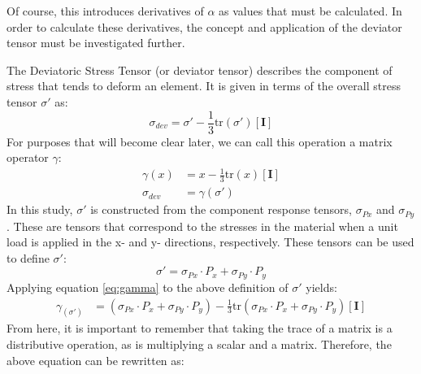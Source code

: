 Of course, this introduces derivatives of $\alpha$ as values that must be calculated. In order to calculate these derivatives, the concept and application of the deviator tensor must be investigated further.


The Deviatoric Stress Tensor (or deviator tensor) describes the component of stress that tends to deform an element. It is given in terms of the overall stress tensor $\sigma'$ as: 
   \begin{equation}
      \sigma_{dev} = \sigma' - \frac{1}{3} \mathrm{tr}(\sigma') \left[ \mathbf{I} \right]
   \end{equation}
For purposes that will become clear later, we can call this operation a matrix operator $\gamma$:
   \begin{align}
      \gamma(x) &= x - \frac{1}{3} \mathrm{tr}(x) \left[ \mathbf{I} \right]\label{eq:gamma}\\
      \sigma_{dev} &= \gamma(\sigma') \nonumber
   \end{align}
In this study, $\sigma'$ is constructed from the component response tensors, $\sigma_{Px}$ and $\sigma_{Py}$. These are tensors that correspond to the stresses in the material when a unit load is applied in the x- and y- directions, respectively. These tensors can be used to define $\sigma'$:
   \begin{equation*}
      \sigma' = \sigma_{Px} \cdot P_x + \sigma_{Py} \cdot P_y
   \end{equation*}
Applying equation \ref{eq:gamma} to the above definition of $\sigma'$ yields:
   \begin{align}
	   \gamma_(\sigma') &= \left(\sigma_{Px} \cdot P_x + \sigma_{Py} \cdot P_y\right) - 
                       \frac{1}{3} \mathrm{tr} \left(\sigma_{Px} \cdot P_x + \sigma_{Py}
                       \cdot P_y\right) \left[ \mathbf{I} \right] 
   \end{align}
From here, it is important to remember that taking the trace of a matrix is a distributive operation, as is multiplying a scalar and a matrix. Therefore, the above equation can be rewritten as: 
